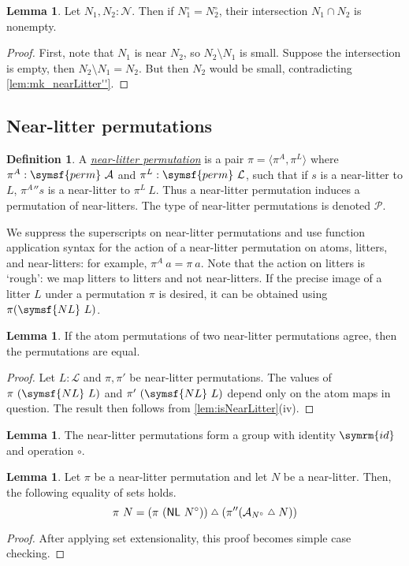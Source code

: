 \documentclass{article}
\newcommand{\cdef}[3]{\href{https://leanprover-community.github.io/con-nf/doc/ConNF/#1.html\#ConNF.#2}{\emph{#3}}}
\newcommand{\symmdiff}{\mathrel{\raisebox{1pt}{\( \mathsmaller\triangle \)}}}
\theoremstyle{definition}
\newtheorem{definition}{Definition}[section]
\newtheorem{lemma}[theorem]{Lemma}
\theoremstyle{remark}
\begin{document}
\begin{lemma}
    Let \( N_1, N_2 : \mathcal N \).
    Then if \( N_1^\circ = N_2^\circ \), their intersection \( N_1 \cap N_2 \) is nonempty.
\end{lemma}
\begin{proof}
    First, note that \( N_1 \) is near \( N_2 \), so \( N_2 \setminus N_1 \) is small.
    Suppose the intersection is empty, then \( N_2 \setminus N_1 = N_2 \).
    But then \( N_2 \) would be small, contradicting \cref{lem:mk_nearLitter''}.
\end{proof}

\subsection{Near-litter permutations}

\begin{definition}
    A \cdef{BaseType/NearLitterPerm}{NearLitterPerm}{near-litter permutation} is a pair \( \pi = \langle \pi^A, \pi^L \rangle \) where \( \pi^A : \symsf{perm}\ \mathcal A \) and \( \pi^L : \symsf{perm}\ \mathcal L \), such that if \( s \) is a near-litter to \( L \), \( {\pi^A} '' s \) is a near-litter to \( \pi^L\ L \).
    Thus a near-litter permutation induces a permutation of near-litters.
    The type of near-litter permutations is denoted \( \mathcal P \).
\end{definition}
We suppress the superscripts on near-litter permutations and use function application syntax for the action of a near-litter permutation on atoms, litters, and near-litters: for example, \( \pi^A\ a = \pi\ a \).
Note that the action on litters is `rough': we map litters to litters and not near-litters.
If the precise image of a litter \( L \) under a permutation \( \pi \) is desired, it can be obtained using \( \pi(\symsf{NL}\ L) \).
\begin{lemma}
    \label{lem:NearLitterPerm.atomPerm_injective}
    If the atom permutations of two near-litter permutations agree, then the permutations are equal.
\end{lemma}
\begin{proof}
    Let \( L : \mathcal L \) and \( \pi, \pi' \) be near-litter permutations.
    The values of \( \pi\ (\symsf{NL}\ L) \) and \( \pi'\ (\symsf{NL}\ L) \) depend only on the atom maps in question.
    The result then follows from \cref{lem:isNearLitter}(iv).
\end{proof}
\begin{lemma}
    The near-litter permutations form a group with identity \( \symrm{id} \) and operation \( \circ \).
\end{lemma}
\begin{lemma}
    \label{lem:smul_nearLitter_eq_smul_symmDiff_smul}
    Let \( \pi \) be a near-litter permutation and let \( N \) be a near-litter.
    Then, the following equality of sets holds.
    \[ \pi\ N = (\pi\ (\mathsf{NL}\ N^\circ)) \symmdiff (\pi '' (\mathcal A_{N^\circ} \symmdiff N)) \]
\end{lemma}
\begin{proof}
    After applying set extensionality, this proof becomes simple case checking.
\end{proof}
\end{document}
